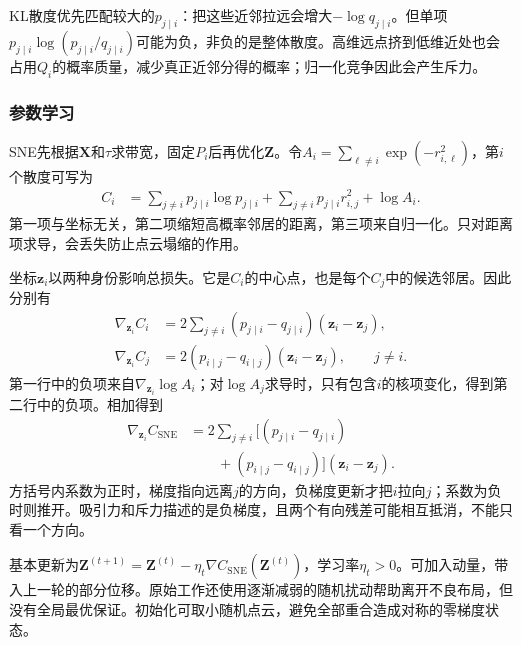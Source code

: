 KL散度优先匹配较大的$p_{j\mid i}$：把这些近邻拉远会增大$-\log q_{j\mid i}$。但单项$p_{j\mid i}\log(p_{j\mid i}/q_{j\mid i})$可能为负，非负的是整体散度。高维远点挤到低维近处也会占用$Q_i$的概率质量，减少真正近邻分得的概率；归一化竞争因此会产生斥力。

\subsubsection{参数学习}

SNE先根据$\bm{X}$和$\tau$求带宽，固定$P_i$后再优化$\bm{Z}$。令$A_i=\sum_{\ell\ne i}\exp(-r_{i,\ell}^2)$，第$i$个散度可写为
\begin{equation}
  \label{eq:dim-sne-anchor-loss}
  \begin{aligned}
    C_i&=\sum_{j\ne i}p_{j\mid i}\log p_{j\mid i}
      +\sum_{j\ne i}p_{j\mid i}r_{i,j}^2+\log A_i.
  \end{aligned}
\end{equation}
第一项与坐标无关，第二项缩短高概率邻居的距离，第三项来自归一化。只对距离项求导，会丢失防止点云塌缩的作用。

坐标$\bm{z}_i$以两种身份影响总损失。它是$C_i$的中心点，也是每个$C_j$中的候选邻居。因此分别有
\begin{equation}
  \label{eq:dim-sne-two-roles}
  \begin{aligned}
    \nabla_{\bm{z}_i}C_i
      &=2\sum_{j\ne i}(p_{j\mid i}-q_{j\mid i})
        (\bm{z}_i-\bm{z}_j),\\
    \nabla_{\bm{z}_i}C_j
      &=2(p_{i\mid j}-q_{i\mid j})
        (\bm{z}_i-\bm{z}_j),\qquad j\ne i.
  \end{aligned}
\end{equation}
第一行中的负项来自$\nabla_{\bm{z}_i}\log A_i$；对$\log A_j$求导时，只有包含$i$的核项变化，得到第二行中的负项。相加得到
\begin{equation}
  \label{eq:dim-sne-gradient}
  \begin{aligned}
    \nabla_{\bm{z}_i}C_{\mathrm{SNE}}
      &=2\sum_{j\ne i}
        \bigl[(p_{j\mid i}-q_{j\mid i})\\
      &\qquad +(p_{i\mid j}-q_{i\mid j})\bigr]
        (\bm{z}_i-\bm{z}_j).
  \end{aligned}
\end{equation}
方括号内系数为正时，梯度指向远离$j$的方向，负梯度更新才把$i$拉向$j$；系数为负时则推开。吸引力和斥力描述的是负梯度，且两个有向残差可能相互抵消，不能只看一个方向。

基本更新为$\bm{Z}^{(t+1)}=\bm{Z}^{(t)}-\eta_t\nabla C_{\mathrm{SNE}}(\bm{Z}^{(t)})$，学习率$\eta_t>0$。可加入动量，带入上一轮的部分位移。原始工作还使用逐渐减弱的随机扰动帮助离开不良布局，但没有全局最优保证。初始化可取小随机点云，避免全部重合造成对称的零梯度状态。

